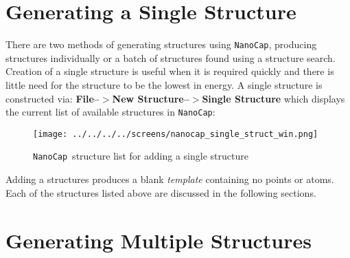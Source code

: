\documentclass{article}
\let\stdsection\section
\renewcommand\section{\pagebreak\stdsection}
\newcommand{\nanocap}{\texttt{NanoCap}}
\begin{document}
\section{Generating a Single Structure}
There are two methods of generating structures using \nanocap, producing structures individually or a batch of structures found using a structure search.  Creation of a single structure is useful when it is required quickly and there is little need for the structure to be the lowest in energy. 
\newline\newline
A single structure is constructed via:
\newline\newline
\textbf{File--$>$New Structure--$>$Single Structure}
\newline\newline
which displays the current list of available structures in \nanocap:
 \begin{figure}[h!]
\centering
\texttt{[image: ../../../../screens/nanocap\_single\_struct\_win.png]}
\caption{\nanocap~structure list for adding a single structure}
\label{f_single_structure_list}
\end{figure}
Adding a structures produces a blank \textit{template} containing no points or atoms. Each of the structures listed above are discussed in the following sections.




\section{Generating Multiple Structures}








\end{document}
